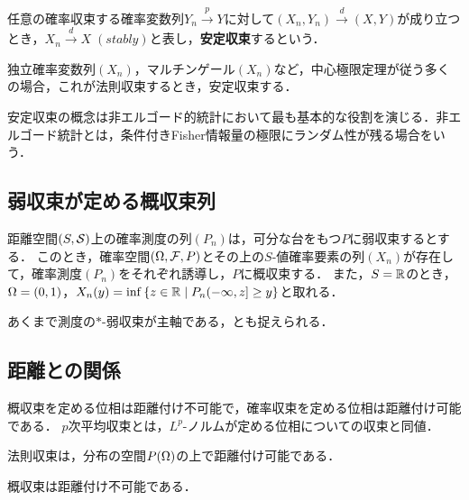 \documentclass[uplatex,dvipdfmx]{jsreport}
\begin{document}
\begin{definition}
    任意の確率収束する確率変数列$Y_n\xrightarrow{p}Y$に対して$(X_n,Y_n)\xrightarrow{d}(X,Y)$が成り立つとき，$X_n\xrightarrow{d}X\;(stably)$と表し，\textbf{安定収束}するという．
\end{definition}
\begin{example}
    独立確率変数列$(X_n)$，マルチンゲール$(X_n)$など，中心極限定理が従う多くの場合，これが法則収束するとき，安定収束する．
\end{example}
\begin{remark}
    安定収束の概念は非エルゴード的統計において最も基本的な役割を演じる．非エルゴード統計とは，条件付きFisher情報量の極限にランダム性が残る場合をいう．
\end{remark}

\subsection{弱収束が定める概収束列}

\begin{theorem}
    距離空間$(S,\mathcal{S})$上の確率測度の列$(P_n)$は，可分な台をもつ$P$に弱収束するとする．
    このとき，確率空間$(\Omega,\mathcal{F},P)$とその上の$S$-値確率要素の列$(X_n)$が存在して，確率測度$(P_n)$をそれぞれ誘導し，$P$に概収束する．
    また，$S=\mathbb{R}$のとき，$\Omega=(0,1)$，$X_n(y)=\inf\left\{z\in\mathbb{R}\mid P_n(-\infty,z]\ge y\right\}$と取れる．
\end{theorem}
\begin{remarks}
    あくまで測度の$*$-弱収束が主軸である，とも捉えられる．
\end{remarks}

\subsection{距離との関係}

\begin{tcolorbox}[colframe=ForestGreen, colback=ForestGreen!10!white,breakable,colbacktitle=ForestGreen!40!white,coltitle=black,fonttitle=\bfseries\sffamily,
title=]
    概収束を定める位相は距離付け不可能で，確率収束を定める位相は距離付け可能である．
    $p$次平均収束とは，$L^p$-ノルムが定める位相についての収束と同値．

    法則収束は，分布の空間$P(\Omega)$の上で距離付け可能である．
\end{tcolorbox}

\begin{proposition}
    概収束は距離付け不可能である．
\end{proposition}
\end{document}
